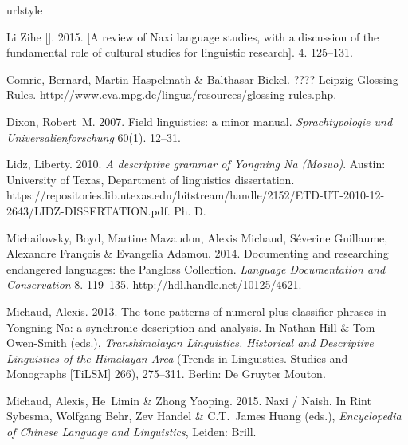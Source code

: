 \begin{thebibliography}{7}
	\providecommand{\natexlab}[1]{#1}
	\providecommand{\url}[1]{#1}
	\providecommand{\urlprefix}{}
	\expandafter\ifx\csname urlstyle\endcsname\relax
	\providecommand{\doi}[1]{doi:\discretionary{}{}{}#1}\else
	\providecommand{\doi}{doi:\discretionary{}{}{}\begingroup
		\urlstyle{rm}\Url}\fi
	
	Li Zihe []. 2015.
	\newblock
	[{A} review of {Naxi} language studies, with a discussion of the fundamental
	role of cultural studies for linguistic research].
	\newblock {} 4. 125--131.
	
	Comrie, Bernard, Martin Haspelmath \& Balthasar Bickel. ????
	\newblock Leipzig {Glossing Rules}.
	\newblock
	\urlprefix\url{http://www.eva.mpg.de/lingua/resources/glossing-rules.php}.
	
	Dixon, Robert~M. 2007.
	\newblock Field linguistics: a minor manual.
	\newblock \emph{Sprachtypologie und Universalienforschung} 60(1). 12--31.
	
	Lidz, Liberty. 2010.
	\newblock \emph{A descriptive grammar of {Yongning Na} ({Mosuo})}.
	\newblock Austin: University of Texas, Department of linguistics dissertation.
	\newblock
	\urlprefix\url{https://repositories.lib.utexas.edu/bitstream/handle/2152/ETD-UT-2010-12-2643/LIDZ-DISSERTATION.pdf}.
	\newblock Ph. D.
	
	Michailovsky, Boyd, Martine Mazaudon, Alexis Michaud, S{\'{e}}verine Guillaume,
	Alexandre Fran{\c{c}}ois \& Evangelia Adamou. 2014.
	\newblock Documenting and researching endangered languages: the {Pangloss
		Collection}.
	\newblock \emph{Language Documentation and Conservation} 8. 119--135.
	\newblock \urlprefix\url{http://hdl.handle.net/10125/4621}.
	
	Michaud, Alexis. 2013.
	\newblock The tone patterns of numeral-plus-classifier phrases in {Yongning
		Na}: a synchronic description and analysis.
	\newblock In Nathan Hill \& Tom Owen-Smith (eds.), \emph{Transhimalayan
		{Linguistics}. {Historical} and {Descriptive} {Linguistics} of the
		{Himalayan} {Area}} (Trends in {Linguistics}. {Studies} and {Monographs}
	[{TiLSM}] 266), 275--311. Berlin: De Gruyter Mouton.
	
	Michaud, Alexis, He~Limin \& Zhong Yaoping. 2015.
	\newblock Naxi / {Naish}.
	\newblock In Rint Sybesma, Wolfgang Behr, Zev Handel \& C.T.~James Huang
	(eds.), \emph{Encyclopedia of {Chinese} {Language} and {Linguistics}},
	Leiden: Brill.
	
\end{thebibliography}

